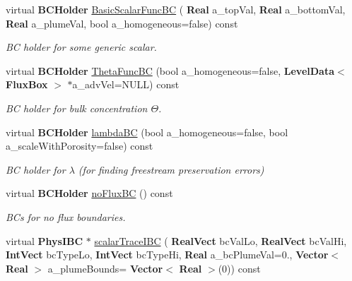 \begin{DoxyCompactItemize}
virtual \textbf{ B\+C\+Holder} \hyperlink{class_phys_b_c_util_aa43f9e82b9b11975d7667ce08cfff8ba}{Basic\+Scalar\+Func\+BC} (\textbf{ Real} a\+\_\+top\+Val, \textbf{ Real} a\+\_\+bottom\+Val, \textbf{ Real} a\+\_\+plume\+Val, bool a\+\_\+homogeneous=false) const
\begin{DoxyCompactList}\small\item\em BC holder for some generic scalar. \end{DoxyCompactList}\item 
\mbox{\label{class_phys_b_c_util_a2aafcf84be5e2bf056d0b1f3cc519738}} 
virtual \textbf{ B\+C\+Holder} \hyperlink{class_phys_b_c_util_a2aafcf84be5e2bf056d0b1f3cc519738}{Theta\+Func\+BC} (bool a\+\_\+homogeneous=false, \textbf{ Level\+Data}$<$ \textbf{ Flux\+Box} $>$ $\ast$a\+\_\+adv\+Vel=N\+U\+LL) const
\begin{DoxyCompactList}\small\item\em BC holder for bulk concentration $ \Theta $. \end{DoxyCompactList}\item 
\mbox{\label{class_phys_b_c_util_a1aee7049a6681ba83c9cd6e3265ad6ac}} 
virtual \textbf{ B\+C\+Holder} \hyperlink{class_phys_b_c_util_a1aee7049a6681ba83c9cd6e3265ad6ac}{lambda\+BC} (bool a\+\_\+homogeneous=false, bool a\+\_\+scale\+With\+Porosity=false) const
\begin{DoxyCompactList}\small\item\em BC holder for $ \lambda $ (for finding freestream preservation errors) \end{DoxyCompactList}\item 
\mbox{\label{class_phys_b_c_util_a088fc328784b3b6641800608f0ee93cb}} 
virtual \textbf{ B\+C\+Holder} \hyperlink{class_phys_b_c_util_a088fc328784b3b6641800608f0ee93cb}{no\+Flux\+BC} () const
\begin{DoxyCompactList}\small\item\em B\+Cs for no flux boundaries. \end{DoxyCompactList}\item 
virtual \textbf{ Phys\+I\+BC} $\ast$ \hyperlink{class_phys_b_c_util_ac7b43cdc70f0f9362da054108813be9a}{scalar\+Trace\+I\+BC} (\textbf{ Real\+Vect} bc\+Val\+Lo, \textbf{ Real\+Vect} bc\+Val\+Hi, \textbf{ Int\+Vect} bc\+Type\+Lo, \textbf{ Int\+Vect} bc\+Type\+Hi, \textbf{ Real} a\+\_\+bc\+Plume\+Val=0., \textbf{ Vector}$<$ \textbf{ Real} $>$ a\+\_\+plume\+Bounds=\textbf{ Vector}$<$ \textbf{ Real} $>$(0)) const

\end{DoxyCompactItemize}
